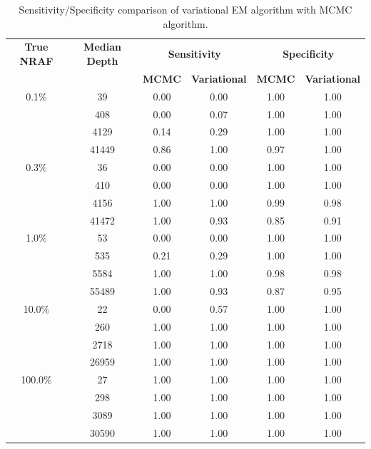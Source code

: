 \documentclass{bmcart}
\begin{document}
\begin{backmatter}
\clearpage
\begin{table}[h!]
\caption{Sensitivity/Specificity comparison of variational EM algorithm with MCMC algorithm.}%
\scriptsize 
\begin{tabular}{c c c c c c }
\hline
\toprule
	{\bfseries True NRAF} & {\bfseries Median Depth} & \multicolumn{2}{c}{{{\bfseries Sensitivity}}} &  \multicolumn{2}{c}{\bfseries Specificity} \\
	\cmidrule(r{4pt}){3-4} \cmidrule(l){5-6}
	 ~ & ~ & {\bfseries MCMC} & {\bfseries Variational} & {\bfseries MCMC} & {\bfseries Variational}   \\
	\midrule
	0.1\% & 39 & 0.00 & 0.00 & 1.00 & 1.00   \\
	 & 408 & 0.00 & 0.07 & 1.00 & 1.00   \\
	 & 4129 & 0.14 & 0.29 & 1.00 & 1.00   \\
	 & 41449 & 0.86 & 1.00 & 0.97 & 1.00   \\
	 \midrule
	0.3\% & 36 & 0.00 & 0.00 & 1.00 & 1.00   \\
	 & 410 & 0.00 & 0.00 & 1.00 & 1.00   \\
	 & 4156 & 1.00 & 1.00 & 0.99 & 0.98   \\
	 & 41472 & 1.00 & 0.93 & 0.85 & 0.91   \\
	 \midrule
	1.0\% & 53 & 0.00 & 0.00 & 1.00 & 1.00   \\
	 & 535 & 0.21 & 0.29 & 1.00 & 1.00  \\
	 & 5584 & 1.00 & 1.00 & 0.98 & 0.98   \\
	 & 55489 & 1.00 & 0.93 & 0.87 & 0.95   \\
	 \midrule
	10.0\% & 22 & 0.00 & 0.57 & 1.00 & 1.00   \\
	 & 260 & 1.00 & 1.00 & 1.00 & 1.00   \\
	 & 2718 & 1.00 & 1.00 & 1.00 & 1.00   \\
	 & 26959 & 1.00 & 1.00 & 1.00 & 1.00   \\
	 \midrule
	100.0\% & 27 & 1.00 & 1.00 & 1.00 & 1.00   \\
	 & 298 & 1.00 & 1.00 & 1.00 & 1.00   \\
	 & 3089 & 1.00 & 1.00 & 1.00 & 1.00   \\
	 & 30590 & 1.00 & 1.00 & 1.00 & 1.00   \\
	\bottomrule
\end{tabular}
\end{table}


\end{backmatter}
\end{document}

